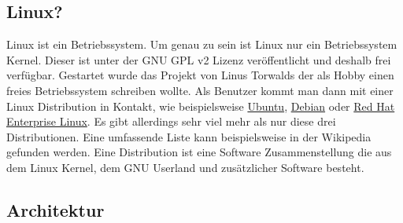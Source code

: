 \subsection{Linux?}
Linux ist ein Betriebssystem.
Um genau zu sein ist Linux nur ein Betriebssystem Kernel.
Dieser ist unter der \acrshort{GNU} GPL v2 Lizenz veröffentlicht \cite{kernelfaq} und deshalb frei verfügbar.
Gestartet wurde das Projekt von Linus Torwalds der als Hobby einen freies Betriebssystem schreiben wollte.\cite{fossbytelinuxannouncement}
Als Benutzer kommt man dann mit einer Linux Distribution in Kontakt, 
wie beispielsweise \href{https://ubuntu.com/}{Ubuntu}, \href{https://www.debian.org/}{Debian} oder \href{https://www.redhat.com/en/technologies/linux-platforms/enterprise-linux}{Red Hat Enterprise Linux}. Es gibt allerdings sehr viel mehr als nur diese drei Distributionen. 
Eine umfassende Liste kann beispielsweise in der Wikipedia gefunden werden. \cite{linuxdistros}
Eine Distribution ist eine Software Zusammenstellung die aus dem 
Linux Kernel, dem \acrshort{GNU} Userland \cite{gnusoftware} und zusätzlicher Software besteht.

\subsection{Architektur}